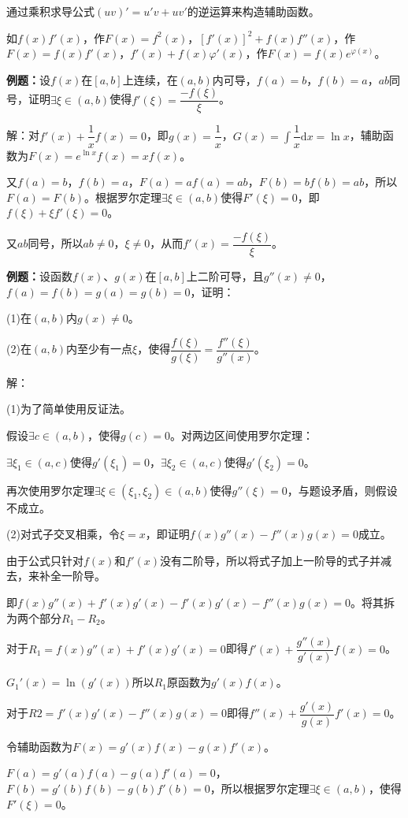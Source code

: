 通过乘积求导公式$(uv)'=u'v+uv'$的逆运算来构造辅助函数。

如$f(x)f'(x)$，作$F(x)=f^2(x)$，$[f'(x)]^2+f(x)f''(x)$，作$F(x)=f(x)f'(x)$，$f'(x)+f(x)\varphi'(x)$，作$F(x)=f(x)e^{\varphi(x)}$。

\textbf{例题：}设$f(x)$在$[a,b]$上连续，在$(a,b)$内可导，$f(a)=b$，$f(b)=a$，$ab$同号，证明$\exists\xi\in(a,b)$使得$f'(\xi)=\dfrac{-f(\xi)}{\xi}$。

解：对$f'(x)+\dfrac{1}{x}f(x)=0$，即$g(x)=\dfrac{1}{x}$，$G(x)=\int\dfrac{1}{x}\textrm{d}x=\ln x$，辅助函数为$F(x)=e^{\ln x}f(x)=xf(x)$。

又$f(a)=b$，$f(b)=a$，$F(a)=af(a)=ab$，$F(b)=bf(b)=ab$，所以$F(a)=F(b)$。根据罗尔定理$\exists\xi\in(a,b)$使得$F'(\xi)=0$，即$f(\xi)+\xi f'(\xi)=0$。

又$ab$同号，所以$ab\neq0$，$\xi\neq0$，从而$f'(x)=\dfrac{-f(\xi)}{\xi}$。

\textbf{例题：}设函数$f(x)$、$g(x)$在$[a,b]$上二阶可导，且$g''(x)\neq0$，$f(a)=f(b)=g(a)=g(b)=0$，证明：

(1)在$(a,b)$内$g(x)\neq0$。

(2)在$(a,b)$内至少有一点$\xi$，使得$\dfrac{f(\xi)}{g(\xi)}=\dfrac{f''(\xi)}{g''(x)}$。

解：

(1)为了简单使用反证法。

假设$\exists c\in(a,b)$，使得$g(c)=0$。对两边区间使用罗尔定理：

$\exists\xi_1\in(a,c)$使得$g'(\xi_1)=0$，$\exists\xi_2\in(a,c)$使得$g'(\xi_2)=0$。

再次使用罗尔定理$\exists\xi\in(\xi_1,\xi_2)\in(a,b)$使得$g''(\xi)=0$，与题设矛盾，则假设不成立。

(2)对式子交叉相乘，令$\xi=x$，即证明$f(x)g''(x)-f''(x)g(x)=0$成立。

由于公式只针对$f(x)$和$f'(x)$没有二阶导，所以将式子加上一阶导的式子并减去，来补全一阶导。

即$f(x)g''(x)+f'(x)g'(x)-f'(x)g'(x)-f''(x)g(x)=0$。将其拆为两个部分$R_1-R_2$。

对于$R_1=f(x)g''(x)+f'(x)g'(x)=0$即得$f'(x)+\dfrac{g''(x)}{g'(x)}f(x)=0$。

$G_1'(x)=\ln(g'(x))$所以$R_1$原函数为$g'(x)f(x)$。

对于$R2=f'(x)g'(x)-f''(x)g(x)=0$即得$f''(x)+\dfrac{g'(x)}{g(x)}f'(x)=0$。

令辅助函数为$F(x)=g'(x)f(x)-g(x)f'(x)$。

$F(a)=g'(a)f(a)-g(a)f'(a)=0$，$F(b)=g'(b)f(b)-g(b)f'(b)=0$，所以根据罗尔定理$\exists\xi\in(a,b)$，使得$F'(\xi)=0$。

